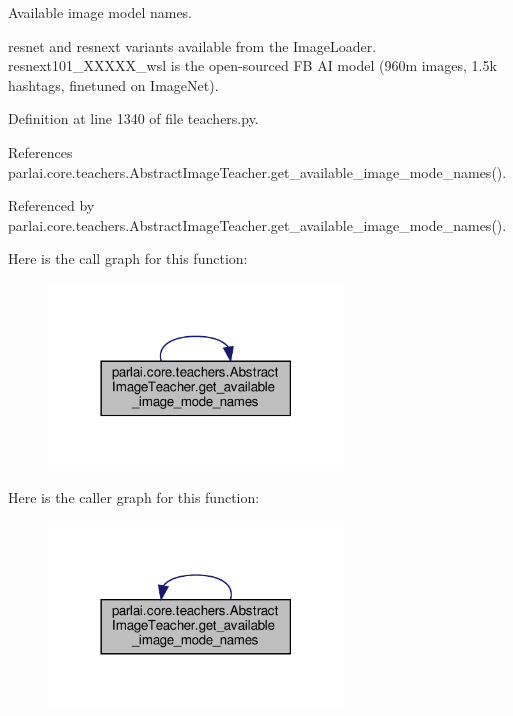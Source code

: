 \begin{DoxyVerb}Available image model names.

resnet and resnext variants available from the ImageLoader.
resnext101_XXXXX_wsl is the open-sourced FB AI model (960m images, 1.5k
hashtags, finetuned on ImageNet).\end{DoxyVerb}
 

Definition at line 1340 of file teachers.\+py.



References parlai.\+core.\+teachers.\+Abstract\+Image\+Teacher.\+get\+\_\+available\+\_\+image\+\_\+mode\+\_\+names().



Referenced by parlai.\+core.\+teachers.\+Abstract\+Image\+Teacher.\+get\+\_\+available\+\_\+image\+\_\+mode\+\_\+names().

Here is the call graph for this function\+:
\nopagebreak
\begin{figure}[H]
\begin{center}
\leavevmode
\includegraphics[width=222pt]{classparlai_1_1core_1_1teachers_1_1AbstractImageTeacher_ab64513ca6c2b1c358f180ee0846b26e0_cgraph}
\end{center}
\end{figure}
Here is the caller graph for this function\+:
\nopagebreak
\begin{figure}[H]
\begin{center}
\leavevmode
\includegraphics[width=222pt]{classparlai_1_1core_1_1teachers_1_1AbstractImageTeacher_ab64513ca6c2b1c358f180ee0846b26e0_icgraph}
\end{center}
\end{figure}
\mbox{\label{classparlai_1_1core_1_1teachers_1_1AbstractImageTeacher_aa3c1da773025838ffa03b47c3fc21c7e}} 
